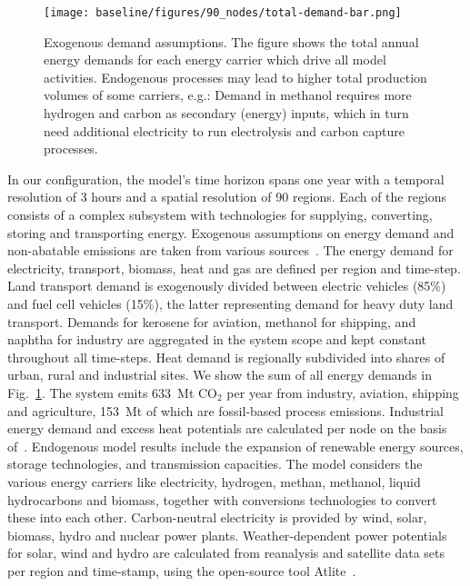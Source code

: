 \documentclass[twocolumn]{article}
\newcommand{\carbon}{CO$_2$}
\begin{document}
\begin{figure}
    \texttt{[image: baseline/figures/90\_nodes/total-demand-bar.png]}
    \caption{Exogenous demand assumptions. The figure shows the total annual energy demands for each energy carrier which drive all model activities. Endogenous processes may lead to higher total production volumes of some carriers, e.g.: Demand in methanol requires more hydrogen and carbon as secondary (energy) inputs, which in turn need additional electricity to run electrolysis and carbon capture processes.}
    \label{fig:total-demand-bar}
\end{figure}
%
In our configuration, the model's time horizon spans one year with a temporal resolution of 3 hours and a spatial resolution of 90 regions. Each of the regions consists of a complex subsystem with technologies for supplying, converting, storing and transporting energy. Exogenous assumptions on energy demand and non-abatable emissions are taken from various sources~\cite{piamanzGeoreferencedIndustrialSites2018,muehlenpfordtTimeSeries2019,mantzosJRCIDEES20152018,NationalEmissionsReported2023,EurostatCompleteEnergyBalance,uwekrienDemandlib2023}. The energy demand for electricity, transport, biomass, heat and gas are defined per region and time-step. Land transport demand is exogenously divided between electric vehicles (85\%) and fuel cell vehicles (15\%), the latter representing demand for heavy duty land transport. Demands for kerosene for aviation, methanol for shipping, and naphtha for industry are aggregated in the system scope and kept constant throughout all time-steps. Heat demand is regionally subdivided into shares of urban, rural and industrial sites. We show the sum of all energy demands in Fig.~\ref{fig:total-demand-bar}. The system emits 633~Mt \carbon{} per year from industry, aviation, shipping and agriculture, 153~Mt of which are fossil-based process emissions. Industrial energy demand and excess heat potentials are calculated per node on the basis of~\cite{hotmaps_industrial_db}.
%
Endogenous model results include the expansion of renewable energy sources, storage technologies, and transmission capacities.
The model considers the various energy carriers like electricity, hydrogen, methan, methanol, liquid hydrocarbons and biomass, together with conversions technologies to convert these into each other.
Carbon-neutral electricity is provided by wind, solar, biomass, hydro and nuclear power plants. Weather-dependent power potentials for solar, wind and hydro are calculated from reanalysis and satellite data sets~\cite{hersbachERA5GlobalReanalysis2020,pfeifrothSurfaceRadiationData2017}  per region and time-stamp, using the open-source tool Atlite~\cite{hofmannAtliteLightweightPython2021}.
\end{document}
